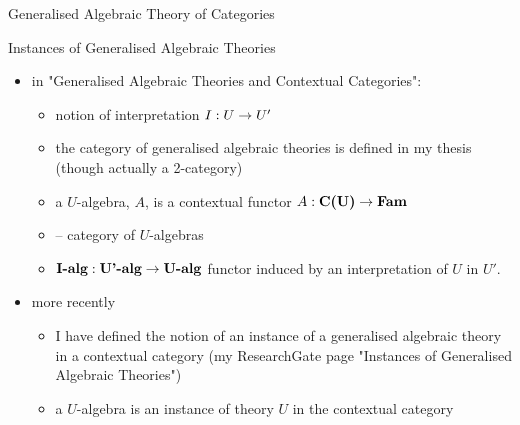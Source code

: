 \begin{frame}{Generalised Algebraic Theory of Categories}
\footnotesize

\end{frame}

\begin{frame}{Instances of Generalised Algebraic Theories}
\begin{itemize}
\item in "Generalised Algebraic Theories and Contextual Categories":
\begin{itemize}
  \item notion of interpretation $I: U \rightarrow U'$ 
  \item the  category of  generalised algebraic theories 
      is defined in my thesis (though actually a 2-category)
  \item  a $U$-algebra, $A$, is a contextual functor $A: \textbf{C(U)} \rightarrow \textbf{Fam}$
  \item {} -- category of $U$-algebras
  \item $\textbf{I-alg}: \textbf{U'-alg} \rightarrow \textbf{U-alg}$ functor induced by an interpretation of $U$ in $U'$.
\end{itemize}
\item more recently 
\begin{itemize}
    \item I have defined the notion of an instance of a generalised algebraic theory in a contextual category
         (my ResearchGate page "Instances of Generalised Algebraic Theories")
    \item a $U$-algebra is an instance of theory $U$ in the contextual category 
\end{itemize}
\end{itemize}
\end{frame}


\newcommand{\USigmaA}{U_{\SigmaA}}
\newcommand{\USigmaAalg}{\USigmaA\mhyphen alg}
\newcommand{\SigmaA}{\Sigma A}

